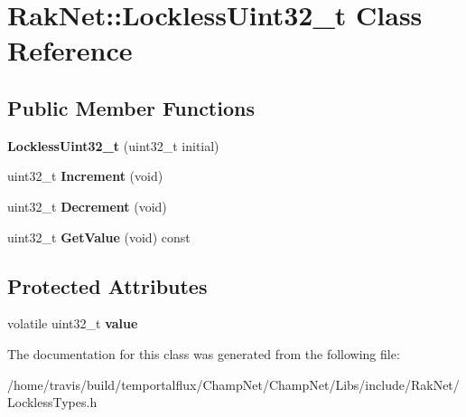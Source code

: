 \hypertarget{class_rak_net_1_1_lockless_uint32__t}{\section{Rak\-Net\-:\-:Lockless\-Uint32\-\_\-t Class Reference}
\label{class_rak_net_1_1_lockless_uint32__t}
}
\subsection*{Public Member Functions}
\begin{DoxyCompactItemize}
\item 
\hypertarget{class_rak_net_1_1_lockless_uint32__t_a2bb6702d62dfa0683e336c0ef4ec3174}{{\bfseries Lockless\-Uint32\-\_\-t} (uint32\-\_\-t initial)}\label{class_rak_net_1_1_lockless_uint32__t_a2bb6702d62dfa0683e336c0ef4ec3174}

\item 
\hypertarget{class_rak_net_1_1_lockless_uint32__t_ab9908d9b2fcb36cbe8387901fc0d604d}{uint32\-\_\-t {\bfseries Increment} (void)}\label{class_rak_net_1_1_lockless_uint32__t_ab9908d9b2fcb36cbe8387901fc0d604d}

\item 
\hypertarget{class_rak_net_1_1_lockless_uint32__t_aacd39e17472ec1c7802762d25dac7c9c}{uint32\-\_\-t {\bfseries Decrement} (void)}\label{class_rak_net_1_1_lockless_uint32__t_aacd39e17472ec1c7802762d25dac7c9c}

\item 
\hypertarget{class_rak_net_1_1_lockless_uint32__t_a9a8c2a97a1dbd42ef9f6a64a0f8e068f}{uint32\-\_\-t {\bfseries Get\-Value} (void) const }\label{class_rak_net_1_1_lockless_uint32__t_a9a8c2a97a1dbd42ef9f6a64a0f8e068f}

\end{DoxyCompactItemize}
\subsection*{Protected Attributes}
\begin{DoxyCompactItemize}
\item 
\hypertarget{class_rak_net_1_1_lockless_uint32__t_a6eb5ad0afd65fc2c60b3babd95130ec4}{volatile uint32\-\_\-t {\bfseries value}}\label{class_rak_net_1_1_lockless_uint32__t_a6eb5ad0afd65fc2c60b3babd95130ec4}

\end{DoxyCompactItemize}


The documentation for this class was generated from the following file\-:\begin{DoxyCompactItemize}
\item 
/home/travis/build/temportalflux/\-Champ\-Net/\-Champ\-Net/\-Libs/include/\-Rak\-Net/Lockless\-Types.\-h\end{DoxyCompactItemize}
